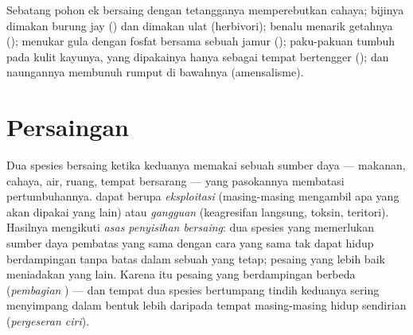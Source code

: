 \begin{example}\label{ex:b1:species-interactions:oak}
Sebatang pohon ek bersaing dengan tetangganya memperebutkan cahaya;
bijinya dimakan burung jay () dan  dimakan ulat
(herbivori); benalu menarik getahnya ();  menukar
gula dengan fosfat bersama sebuah jamur (); paku-pakuan
tumbuh pada kulit kayunya, yang dipakainya hanya sebagai tempat
bertengger (); dan naungannya membunuh rumput di bawahnya
(amensalisme).
\end{example}

\section{Persaingan}

\begin{definition}\label{def:b1:species-interactions:competition}
Dua spesies bersaing ketika keduanya memakai sebuah sumber daya ---
makanan, cahaya, air, ruang, tempat bersarang --- yang pasokannya
membatasi pertumbuhannya.  dapat berupa
\emph{eksploitasi} (masing-masing mengambil apa yang akan dipakai yang
lain) atau \emph{gangguan} (keagresifan langsung, toksin, teritori).
Hasilnya mengikuti \emph{asas penyisihan bersaing}: dua spesies yang
memerlukan sumber daya pembatas yang sama dengan cara yang sama tak
dapat hidup berdampingan tanpa batas dalam sebuah  yang
tetap; pesaing yang lebih baik meniadakan yang lain. Karena itu
pesaing yang berdampingan berbeda  (\emph{pembagian })
--- dan tempat dua spesies bertumpang tindih keduanya sering menyimpang
dalam bentuk lebih daripada tempat masing-masing hidup sendirian
(\emph{pergeseran ciri}).
\end{definition}


